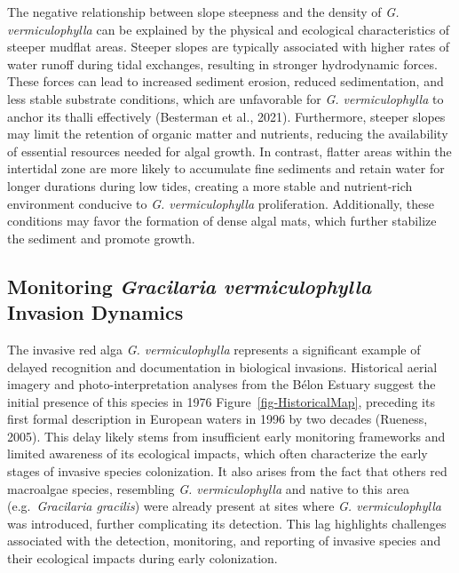 \documentclass[
  letterpaper,
  DIV=11,
  numbers=noendperiod]{scrartcl}
\begin{document}
The negative relationship between slope steepness and the density of
\emph{G. vermiculophylla} can be explained by the physical and
ecological characteristics of steeper mudflat areas. Steeper slopes are
typically associated with higher rates of water runoff during tidal
exchanges, resulting in stronger hydrodynamic forces. These forces can
lead to increased sediment erosion, reduced sedimentation, and less
stable substrate conditions, which are unfavorable for \emph{G.
vermiculophylla} to anchor its thalli effectively (Besterman et al.,
2021). Furthermore, steeper slopes may limit the retention of organic
matter and nutrients, reducing the availability of essential resources
needed for algal growth. In contrast, flatter areas within the
intertidal zone are more likely to accumulate fine sediments and retain
water for longer durations during low tides, creating a more stable and
nutrient-rich environment conducive to \emph{G. vermiculophylla}
proliferation. Additionally, these conditions may favor the formation of
dense algal mats, which further stabilize the sediment and promote
growth.

\subsection{\texorpdfstring{Monitoring \emph{Gracilaria vermiculophylla}
Invasion
Dynamics}{Monitoring Gracilaria vermiculophylla Invasion Dynamics}}\label{monitoring-gracilaria-vermiculophylla-invasion-dynamics}

The invasive red alga \emph{G. vermiculophylla} represents a significant
example of delayed recognition and documentation in biological
invasions. Historical aerial imagery and photo-interpretation analyses
from the Bélon Estuary suggest the initial presence of this species in
1976 Figure~\ref{fig-HistoricalMap}, preceding its first formal
description in European waters in 1996 by two decades (Rueness, 2005).
This delay likely stems from insufficient early monitoring frameworks
and limited awareness of its ecological impacts, which often
characterize the early stages of invasive species colonization. It also
arises from the fact that others red macroalgae species, resembling
\emph{G. vermiculophylla} and native to this area (e.g.~\emph{Gracilaria
gracilis}) were already present at sites where \emph{G. vermiculophylla}
was introduced, further complicating its detection. This lag highlights
challenges associated with the detection, monitoring, and reporting of
invasive species and their ecological impacts during early colonization.
\end{document}
